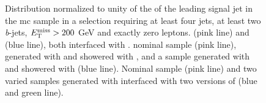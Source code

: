 \begin{figure}[htb]
\centering 
{}
\caption{Distribution normalized to unity of the \pt of the leading signal jet in the \ttbar \gls{mc} sample in a selection requiring at least four jets, at least two \textit{b}-jets, $E_{\rm T}^{\mathrm{miss}}>200$ GeV and exactly zero leptons. 
 \PowhegBox (pink line) and \aNLO (blue line), both interfaced with \HWpp.
 nominal sample (pink line), generated with \PowhegBox and showered with \PY, and a sample generated with \PowhegBox and showered with \HWpp (blue line).
 Nominal sample (pink line) and two varied samples generated with \PowhegBox interfaced with two versions of \PY (blue and green line).}\label{fig:ttbar_ptj1_0L_syst}
\end{figure}



